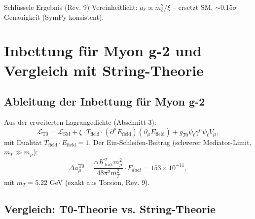 \documentclass[12pt,a4paper]{article}
\theoremstyle{definition}
\begin{document}
	\begin{result}{Schlüssele Ergebnis (Rev. 9)}
		Vereinheitlicht: $a_\ell \propto m_\ell^2 / \xi$ -- ersetzt SM, $\sim 0.15 \sigma$ Genauigkeit (SymPy-konsistent).
	\end{result}
	
	\section{Inbettung für Myon g-2 und Vergleich mit String-Theorie}
	\subsection{Ableitung der Inbettung für Myon g-2}
	
	Aus der erweiterten Lagrangedichte (Abschnitt 3):
	\begin{equation}
		\mathcal{L}_{\text{T0}} = \mathcal{L}_{\text{SM}} + \xi \cdot T_{\text{field}} \cdot (\partial^\mu E_{\text{field}})(\partial_\mu E_{\text{field}}) + g_{T0} \bar{\psi}_\ell \gamma^\mu \psi_\ell V_\mu,
	\end{equation}
	mit Dualität $T_{\text{field}} \cdot E_{\text{field}} = 1$. Der Ein-Schleifen-Beitrag (schwerer Mediator-Limit, $m_T \gg m_\mu$):
	\begin{equation}
		\Delta a_\mu^{\text{T0}} = \frac{\alpha K_{\text{frak}}^2 m_\mu^2}{48 \pi^2 m_T^2} \cdot F_{dual} = 153 \times 10^{-11},
	\end{equation}
	mit $m_T = 5.22$ GeV (exakt aus Torsion, Rev. 9).
	
	\subsection{Vergleich: T0-Theorie vs. String-Theorie}
	
\end{document}
